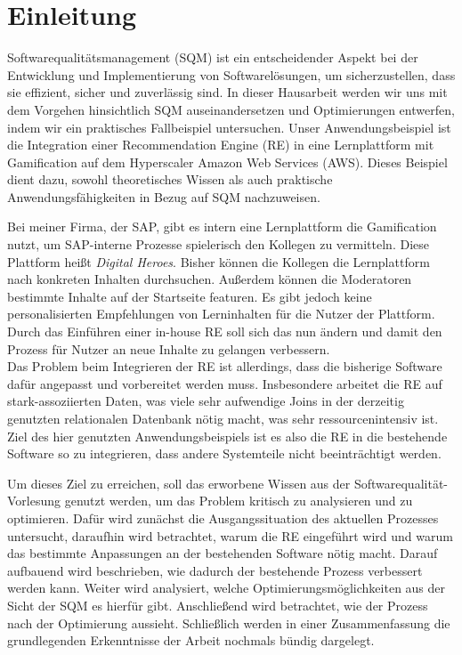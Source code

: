 \chapter{Einleitung}

Softwarequalitätsmanagement (SQM) ist ein entscheidender Aspekt bei der Entwicklung und Implementierung von Softwarelösungen, 
um sicherzustellen, dass sie effizient, sicher und zuverlässig sind. In dieser Hausarbeit werden wir uns mit dem Vorgehen 
hinsichtlich SQM auseinandersetzen und Optimierungen entwerfen, indem wir ein praktisches Fallbeispiel untersuchen. 
Unser Anwendungsbeispiel ist die Integration einer Recommendation Engine (RE) in eine Lernplattform mit Gamification 
auf dem Hyperscaler Amazon Web Services (AWS). Dieses Beispiel dient dazu, sowohl theoretisches Wissen als auch praktische 
Anwendungsfähigkeiten in Bezug auf SQM nachzuweisen.

Bei meiner Firma, der SAP, gibt es intern eine Lernplattform die Gamification nutzt, um SAP-interne Prozesse 
spielerisch den Kollegen zu vermitteln. Diese Plattform heißt \textit{Digital Heroes}. 
Bisher können die Kollegen die Lernplattform nach konkreten Inhalten durchsuchen. 
Außerdem können die Moderatoren bestimmte Inhalte auf der Startseite featuren. Es gibt jedoch keine 
personalisierten Empfehlungen von Lerninhalten für die Nutzer der Plattform. 
Durch das Einführen einer in-house RE soll sich das nun ändern und damit den Prozess für Nutzer an neue Inhalte 
zu gelangen verbessern.  \\
Das Problem beim Integrieren der RE ist allerdings, dass die bisherige Software dafür angepasst 
und vorbereitet werden muss. Insbesondere arbeitet die RE auf stark-assoziierten Daten, 
was viele sehr aufwendige Joins in der derzeitig genutzten relationalen Datenbank nötig macht, 
was sehr ressourcenintensiv ist.  
Ziel des hier genutzten Anwendungsbeispiels ist es also die RE in die bestehende Software so zu integrieren, 
dass andere Systemteile nicht beeinträchtigt werden. 

Um dieses Ziel zu erreichen, soll das erworbene Wissen aus der Softwarequalität-Vorlesung genutzt werden, 
um das Problem kritisch zu analysieren und zu optimieren. 
Dafür wird zunächst die Ausgangssituation des aktuellen Prozesses untersucht, 
daraufhin wird betrachtet, warum die RE eingeführt wird und warum das bestimmte Anpassungen an der 
bestehenden Software nötig macht. Darauf aufbauend wird beschrieben, wie dadurch der bestehende 
Prozess verbessert werden kann. Weiter wird analysiert, welche Optimierungsmöglichkeiten aus der Sicht 
der SQM es hierfür gibt. Anschließend wird betrachtet, wie der Prozess nach der Optimierung aussieht. 
Schließlich werden in einer Zusammenfassung die grundlegenden Erkenntnisse der Arbeit nochmals bündig dargelegt.

